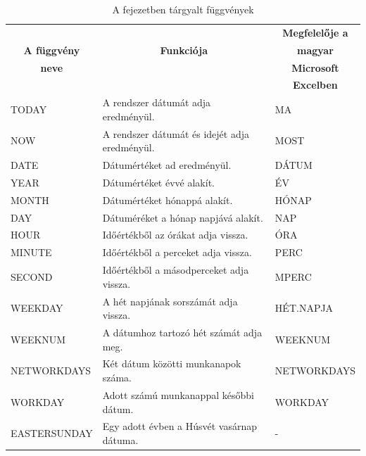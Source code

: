 \begin{table}[!h]
\begin{center}
\caption{A fejezetben tárgyalt függvények}\label{14-fejezetFüggvények}
\begin{tabular}{|m{3cm}|m{8cm}|m{3cm}|}
\hline
 & & \multicolumn{1}{c|}{\textbf{Megfelelője a}} \\
\multicolumn{1}{|c|}{\textbf{A függvény}}&
\multicolumn{1}{c|}{\textbf{Funkciója}}&
\multicolumn{1}{c|}{\textbf{magyar}} \\
\multicolumn{1}{|c|}{\textbf{neve}} & &
\multicolumn{1}{c|}{\textbf{Microsoft}} \\
 & & \multicolumn{1}{c|}{\textbf{Excelben}} \\
\hline
TODAY & A rendszer dátumát adja eredményül. & MA\\ \hline
NOW & A rendszer dátumát és idejét adja eredményül. & MOST\\ \hline
DATE & Dátumértéket ad eredményül. & DÁTUM\\ \hline
YEAR & Dátumértéket évvé alakít. & ÉV\\ \hline
MONTH & Dátumértéket hónappá alakít. & HÓNAP\\ \hline
DAY & Dátuméréket a hónap napjává alakít. & NAP\\ \hline
HOUR & Időértékből az órákat adja vissza. & ÓRA\\ \hline
MINUTE & Időértékből a perceket adja vissza. & PERC\\ \hline
SECOND & Időértékből a másodperceket adja vissza. & MPERC\\ \hline
WEEKDAY & A hét napjának sorszámát adja vissza. & HÉT.NAPJA\\ \hline
WEEKNUM & A dátumhoz tartozó hét számát adja meg. & WEEKNUM\\ \hline
NETWORKDAYS & Két dátum közötti munkanapok száma. & NETWORKDAYS\\ \hline
WORKDAY & Adott számú munkanappal későbbi dátum. & WORKDAY\\ \hline
EASTERSUNDAY & Egy adott évben a Húsvét vasárnap dátuma. & {}-\\ \hline
\end{tabular}
\end{center}
\end{table}

